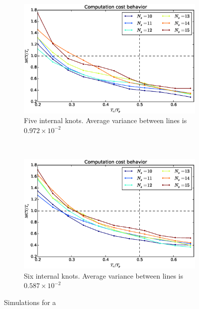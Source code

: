 \documentclass[eprint]{actapoly}
\begin{document}
\begin{figure}[!h]
        ~ %
        \begin{subfigure}[b]{0.48\textwidth}
                \includegraphics[width=\textwidth]{./images/realtime/Scenario_3__N_knots_5/mcttc-tctp.eps}
                \caption{Five internal knots. Average variance between lines is $0.972\times 10^{-2}$}\label{fig:uni35}
        \end{subfigure}
        ~ %
        \begin{subfigure}[b]{0.48\textwidth}
                \includegraphics[width=\textwidth]{./images/realtime/Scenario_3__N_knots_6/mcttc-tctp.eps}
                \caption{Six internal knots. Average variance between lines is $0.587\times 10^{-2}$}\label{fig:uni36}
        \end{subfigure}
        \caption{Simulations for a }\label{fig:uni3}
\end{figure}
\end{document}
